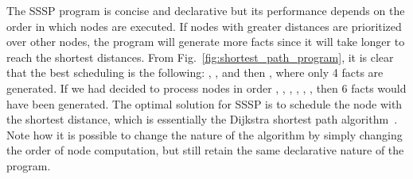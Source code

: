 The SSSP program is concise and declarative but its performance depends on the
order in which nodes are executed. If nodes with greater distances are
prioritized over other nodes, the program will generate more  facts
since it will take longer to reach the shortest distances. From
Fig.~\ref{fig:shortest_path_program}, it is clear that the best scheduling is
the following: , ,  and then , where only 4
 facts are generated. If we had decided to process nodes in order
, , , , , , then 6
 facts would have been generated.  The optimal solution for SSSP is
to schedule the node with the shortest distance, which is essentially the
Dijkstra shortest path algorithm~\cite{Dijkstra}. Note how it is possible to
change the nature of the algorithm by simply changing the order of node
computation, but still retain the same declarative nature of the program.

